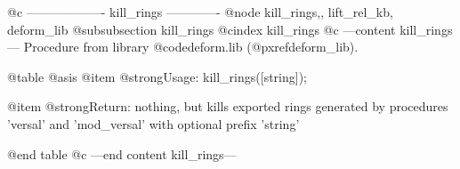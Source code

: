 @c ------------------- kill_rings -------------
@node kill_rings,, lift_rel_kb, deform_lib
@subsubsection kill_rings
@cindex kill_rings
@c ---content kill_rings---
Procedure from library @code{deform.lib} (@pxref{deform_lib}).

@table @asis
@item @strong{Usage:}
kill_rings([string]);

@item @strong{Return:}
nothing, but kills exported rings generated by procedures
'versal' and 'mod_versal' with optional prefix 'string'

@end table
@c ---end content kill_rings---
